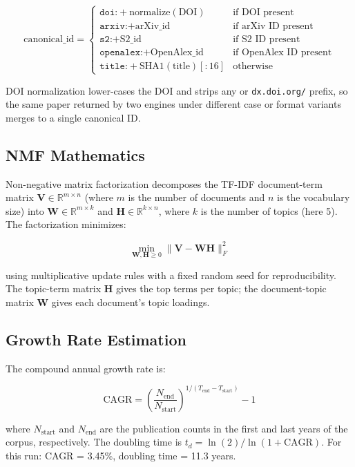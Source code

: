 \documentclass[
  english,
]{article}
\begin{document}
\[
\text{canonical\_id} = \begin{cases}
\texttt{doi:} + \text{normalize}(\text{DOI}) & \text{if DOI present} \\
\texttt{arxiv:} + \text{arXiv\_id} & \text{if arXiv ID present} \\
\texttt{s2:} + \text{S2\_id} & \text{if S2 ID present} \\
\texttt{openalex:} + \text{OpenAlex\_id} & \text{if OpenAlex ID present} \\
\texttt{title:} + \text{SHA1}(\text{title})[:16] & \text{otherwise}
\end{cases}
\]

DOI normalization lower-cases the DOI and strips any
 or \texttt{dx.doi.org/} prefix, so the same
paper returned by two engines under different case or format variants
merges to a single canonical ID.

\subsection{NMF Mathematics}\label{nmf-mathematics}

Non-negative matrix factorization decomposes the TF-IDF document-term
matrix \(\mathbf{V} \in \mathbb{R}^{m \times n}\) (where \(m\) is the
number of documents and \(n\) is the vocabulary size) into
\(\mathbf{W} \in \mathbb{R}^{m \times k}\) and
\(\mathbf{H} \in \mathbb{R}^{k \times n}\), where \(k\) is the number of
topics (here 5). The factorization minimizes:

\[
\min_{\mathbf{W}, \mathbf{H} \geq 0} \|\mathbf{V} - \mathbf{W} \mathbf{H}\|_F^2
\]

using multiplicative update rules \citep{lee1999learning} with a fixed
random seed for reproducibility. The topic-term matrix \(\mathbf{H}\)
gives the top terms per topic; the document-topic matrix \(\mathbf{W}\)
gives each document's topic loadings.

\subsection{Growth Rate Estimation}\label{growth-rate-estimation}

The compound annual growth rate is:

\[
\text{CAGR} = \left(\frac{N_{\text{end}}}{N_{\text{start}}}\right)^{1/(T_{\text{end}} - T_{\text{start}})} - 1
\]

where \(N_{\text{start}}\) and \(N_{\text{end}}\) are the publication
counts in the first and last years of the corpus, respectively. The
doubling time is \(t_d = \ln(2) / \ln(1 + \text{CAGR})\). For this run:
CAGR = 3.45\%, doubling time = 11.3 years.
\end{document}
